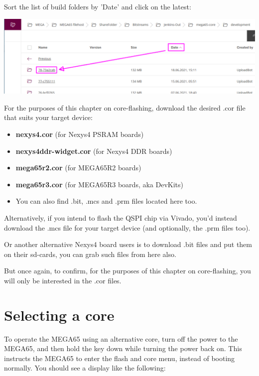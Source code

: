 Sort the list of build folders by 'Date' and click on the latest:

\includegraphics[width=\linewidth]{images/latest_bitstream.png}

For the purposes of this chapter on core-flashing, download the desired .cor file that suits your target device:

\begin{itemize}
  \item{\textbf{nexys4.cor} (for Nexys4 PSRAM boards)}
  \item{\textbf{nexys4ddr-widget.cor} (for Nexys4 DDR boards)}
  \item{\textbf{mega65r2.cor} (for MEGA65R2 boards)}
  \item{\textbf{mega65r3.cor} (for MEGA65R3 boards, aka DevKits)}
  \item{You can also find .bit, .mcs and .prm files located here too.}
\end{itemize}

Alternatively, if you intend to flash the QSPI chip via Vivado, you'd instead download the .mcs file for your target device (and optionally, the .prm files too).

Or another alternative Nexys4 board users is to download .bit files and put them on their sd-cards, you can grab such files from here also.

But once again, to confirm, for the purposes of this chapter on core-flashing, you will only be interested in the .cor files.

\section{Selecting a core}

To operate the MEGA65 using an alternative core, turn off the power to the MEGA65, and then hold the
 key down while turning the power back on.  This instructs the MEGA65 to enter the
flash and core menu, instead of booting normally.  You should see a display like the following:

